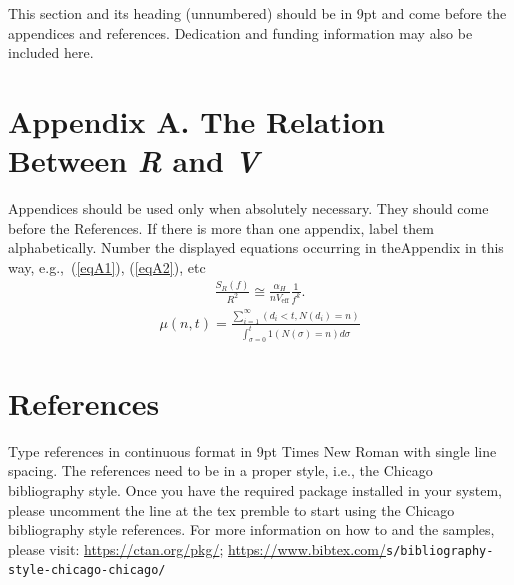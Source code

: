 \documentclass[twocolumn]{rps-esrel2026}
\begin{document}
\begin{acknowledgement}
This section and its heading (unnumbered) should be in 9pt and come before the appendices and references.  Dedication and funding information may also be included here. 

\renewcommand\theequation{A.\arabic{equation}}
\setcounter{equation}{0}
\section*{\headfont Appendix A. The Relation Between {\it R} and {\it V}}

Appendices should be used only when absolutely necessary.  They
should come before the References.  If there is more than one
appendix, label them alphabetically.  Number the displayed equations
occurring in the\break Appendix in this way, e.g.,~(\ref{eqA1}),
(\ref{eqA2}), etc
\begin{eqnarray}\label{eqA1}
\frac{S_R (f)}{R^2} \cong \frac{\alpha _H }{nV_{\mbox{eff}} }\frac{1}{f^k}.
\end{eqnarray}
\begin{eqnarray}\label{eqA2}
\mu (n,t) = \frac{{\sum}^{\infty}_{i=1}(d_i < t, N(d_i)=n)}{{\int}^{t}_{\sigma=0}1(N({\sigma})=n)d{\sigma}}
\end{eqnarray}

\section*{References}

Type references in continuous format in 9pt Times New Roman with single line spacing.   The references need to be in a proper style, i.e., the
Chicago bibliography style. Once you have the required package installed in your system, please uncomment the line at the tex premble to start using the 
Chicago bibliography style references. For more information on how to
and the samples, please visit: \url{https://ctan.org/pkg/}; \url{https://www.bibtex.com/}{\tt s/bibliography-\break style-chicago-chicago/}



\end{acknowledgement}
\end{document}
